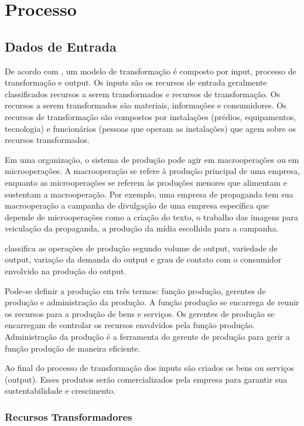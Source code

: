 \chapter[Processo]{Processo}

\section{Dados de Entrada}

De acordo com \cite{slack}, um modelo de transformação é composto por input, processo de transformação e output. Os inputs são os recursos de entrada geralmente classificados recursos a serem transformados e recursos de transformação. Os recursos a serem transformados são materiais, informações e consumidores. Os recursos de transformação são compostos por instalações (prédios, equipamentos, tecnologia) e funcionários (pessoas que operam as instalações) que agem sobre os recursos transformados.
 
Em uma organização, o sistema de produção pode agir em macrooperações ou em microoperações. A macrooperação se refere à produção principal de uma empresa, enquanto as microoperações se referem às produções menores que alimentam e sustentam a macrooperação. Por exemplo, uma empresa de propaganda tem sua macrooperação a campanha de divulgação de uma empresa específica que depende de microoperações como a criação do texto, o trabalho das imagens para veiculação da propaganda, a produção da mídia escolhida para a campanha.

\cite{slack} classifica as operações de produção segundo volume de output, variedade de output, variação da demanda do output e grau de contato com o consumidor envolvido na produção do output. 

Pode-se definir a produção em três termos: função produção, gerentes de produção e administração da produção. A função produção se encarrega de reunir os recursos para a produção de bens e serviços. Os gerentes de produção se encarregam de controlar os recursos envolvidos pela função produção. Administração da produção é a ferramenta do gerente de produção para gerir a função produção de maneira eficiente.

Ao final do processo de transformação dos inputs são criados os bens ou serviços (output). Esses produtos serão comercializados pela empresa para garantir sua sustentabilidade e crescimento.

\subsection{Recursos Transformadores}


